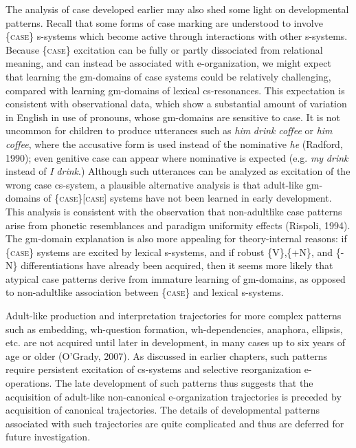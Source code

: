   The analysis of case developed earlier may also shed some light on developmental patterns. Recall that some forms of case marking are understood to involve \{\textsc{case}\} s-systems which become active through interactions with other s-systems. Because \{\textsc{case}\} excitation can be fully or partly dissociated from relational meaning, and can instead be associated with e-organization, we might expect that learning the gm-domains of case systems could be relatively challenging, compared with learning gm-domains of lexical cs-resonances. This expectation is consistent with observational data, which show a substantial amount of variation in English in use of pronouns, whose gm-domains are sensitive to case. It is not uncommon for children to produce utterances such as \textit{him} \textit{drink} \textit{coffee} or \textit{him} \textit{coffee}, where the accusative form is used instead of the nominative \textit{he} (Radford, 1990); even genitive case can appear where nominative is expected (e.g. \textit{my} \textit{drink} instead of \textit{I} \textit{drink}.) Although such utterances can be analyzed as excitation of the wrong case cs-system, a plausible alternative analysis is that adult-like gm-domains of \{\textsc{case}\}[\textsc{case}] systems have not been learned in early development. This analysis is consistent with the observation that non-adultlike case patterns arise from phonetic resemblances and paradigm uniformity effects (Rispoli, 1994). The gm-domain explanation is also more appealing for theory-internal reasons: if \{\textsc{case}\} systems are excited by lexical s-systems, and if robust \{V\},\{+N\}, and \{-N\} differentiations have already been acquired, then it seems more likely that atypical case patterns derive from immature learning of gm-domains, as opposed to non-adultlike association between \{\textsc{case}\} and lexical s-systems. 

  Adult-like production and interpretation trajectories for more complex patterns such as embedding, wh-question formation, wh-dependencies, anaphora, ellipsis, etc. are not acquired until later in development, in many cases up to six years of age or older (O’Grady, 2007). As discussed in earlier chapters, such patterns require persistent excitation of cs-systems and selective reorganization e-operations. The late development of such patterns thus suggests that the acquisition of adult-like non-canonical e-organization trajectories is preceded by acquisition of canonical trajectories. The details of developmental patterns associated with such trajectories are quite complicated and thus are deferred for future investigation.

